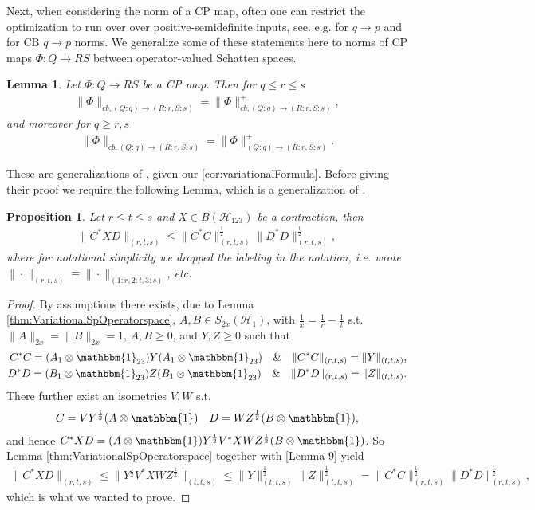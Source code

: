\documentclass[11pt]{article}
\newcommand{\1}{\ensuremath{\mathbbm{1}}}
\theoremstyle{newdefinition}
\theoremstyle{newplain}
\newtheorem{lemma}[definition]{Lemma}
\newtheorem{proposition}[definition]{Proposition}
\theoremstyle{myplain}
\begin{document}
Next, when considering the norm of a CP map, often one can restrict the optimization to run over over positive-semidefinite inputs, see. e.g. \cite{Watrous.2004} for $q\to p$ and \cite{Devetak.2006} for CB $q\to p$ norms. We generalize some of these statements here to norms of CP maps $\Phi:Q\to RS$ between operator-valued Schatten spaces. 
\begin{lemma}\label{lem:positivesufficiency} 
Let $\Phi:Q\to RS$ be a CP map. Then for $q\leq r\leq s$
\begin{align}
    \|\Phi\|_{cb, (Q:q)\to (R:r,S:s)}= \|\Phi\|^+_{cb, (Q:q)\to (R:r,S:s)},
\end{align} and moreover for $q \geq r,s$
\begin{align}
    \|\Phi\|_{cb,( Q:q)\to (R:r,S:s)}= \|\Phi\|^+_{(Q:q)\to (R:r,S:s)}.
\end{align} 
\end{lemma}
These are generalizations of \cite[Theorem 12 and 13 respectively]{Devetak.2006}, given our \cref{cor:variationalFormula}. Before giving their proof  we require the following Lemma, which is a generalization of \cite[Lemma 9]{Devetak.2006}.
\begin{proposition} \label{prop:ContractionInequality}
Let $r\leq t\leq s$ and $X\in B(\mathcal{H}_{123})$ be a contraction, then
\begin{align}
    \|C^*XD\|_{(r,t,s)}\leq \|C^*C\|_{(r,t,s)}^{\frac{1}{2}}\|D^*D\|_{(r,t,s)}^{\frac{1}{2}},
\end{align} where for notational simplicity we dropped the labeling in the notation, i.e. wrote $\|\cdot\|_{(r,t,s)}\equiv \|\cdot\|_{(1:r,2:t,3:s)}$, etc. 
\end{proposition}
\begin{proof}
By assumptions there exists, due to Lemma \ref{thm:VariationalSpOperatorspace}, $A,B\in S_{2x}(\mathcal{H}_1)$, with $\frac{1}{x}=\frac{1}{r}-\frac{1}{t}$ s.t. $\|A\|_{2x}=\|B\|_{2x}=1$, $A,B\geq 0$, and $Y,Z\geq 0$ such that
\begin{align}
    C^*C=(A_1\otimes\1_{23})Y(A_1\otimes\1_{23}) \quad \& \quad \|C^*C\|_{(r,t,s)}=\|Y\|_{(t,t,s)}, \\
    D^*D=(B_1\otimes\1_{23})Z(B_1\otimes\1_{23}) \quad \& \quad \|D^*D\|_{(r,t,s)}=\|Z\|_{(t,t,s)}. \\
\end{align} %
There further exist an isometries $V, W$ s.t.
\begin{align}
    C=VY^{\frac{1}{2}}(A\otimes \1) \quad     D=WZ^{\frac{1}{2}}(B\otimes \1),
\end{align} and hence $C^*XD=(A\otimes\1)Y^{\frac{1}{2}}V^*XWZ^{\frac{1}{2}}(B\otimes\1)$. So Lemma \ref{thm:VariationalSpOperatorspace} together with \cite{Devetak.2006}[Lemma 9] yield
\begin{align}
    \|C^*XD\|_{(r,t,s)}\leq \|Y^{\frac{1}{2}}V^*XWZ^{\frac{1}{2}}\|_{(t,t,s)}\leq \|Y\|^{\frac{1}{2}}_{(t,t,s)}\|Z\|^{\frac{1}{2}}_{(t,t,s)} = \|C^*C\|^{\frac{1}{2}}_{(r,t,s)}\|D^*D\|^{\frac{1}{2}}_{(r,t,s)},
\end{align}
which is what we wanted to prove.
\end{proof}
\end{document}
